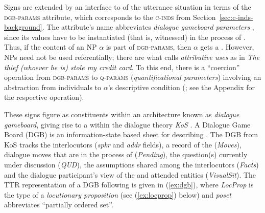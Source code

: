 \documentclass[output=paper
	        ,collection
	        ,collectionchapter
 	        ,biblatex
                ,babelshorthands
                ,newtxmath
                ,draftmode
                ,colorlinks, citecolor=brown
]{langscibook}
\begin{document}
Signs are extended by an interface to  of the utterance situation in terms of the \textsc{dgb-params}  attribute, which corresponds to the \textsc{c-inds} from Section~\ref{sec:c-inds-background}.
%
The attribute's name abbreviates \emph{dialogue gameboard parameters} , since its values have to be instantiated (that is, witnessed)  in the process of .
%
Thus, if the content of an NP $\alpha$ is part of \textsc{dgb-params}, then $\alpha$ gets a .
%
However, NPs need not be used referentially; there are what \citet{Donellan:1966} calls \emph{attributive uses}  as in \textit{The thief (whoever he is) stole my credit card}.
%
To this end, there is a \enquote{coercion} operation from \textsc{dgb-params} to \textsc{q-params}  (\emph{quantificational parameters})  involving an abstraction from individuals to $\alpha$'s descriptive condition (\citealt{Purver:Ginzburg:2004}; see the Appendix for the respective operation).


These \HPSGTTR signs figure as constituents within an architecture known as \emph{dialogue gameboard}, giving rise to a  within the dialogue theory \emph{KoS}
\citep{Ginzburg:1994,Ginzburg:1996,Ginzburg:2003,Ginzburg:2012}. 
%
A Dialogue Game Board (DGB) is an information-state based sheet for describing .
%
The DGB from KoS tracks the interlocutors (\textit{spkr} and \textit{addr} fields), a record of the  (\textit{Moves}), dialogue moves that are in the process of  (\textit{Pending}), the question(s) currently under discussion  (\textit{QUD}), the assumptions shared among the interlocutors (\textit{Facts}) and   the dialogue
participant's view of 
the  and attended entities (\textit{VisualSit}).
%
  
The TTR representation of a DGB following \citet{Ginzburg:2012} is given in (\ref{ex:dgb}), where \textit{LocProp} is the type of a \emph{locutionary proposition} (see (\ref{ex:locprop}) below) and \textit{poset} abbreviates \enquote{partially ordered set}.
%
\ea \label{ex:dgb}
\z
\end{document}
